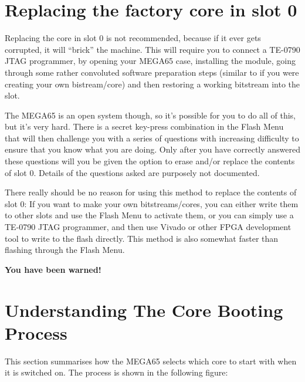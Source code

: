 \section{Replacing the factory core in slot 0}

Replacing the core in slot 0 is not recommended, because if it ever gets corrupted, it will ``brick'' the machine.
This will require you to connect a TE-0790 JTAG programmer, by opening your MEGA65 case, installing
the module, going through some rather convoluted software preparation steps (similar to if you were
creating your own bistream/core) and then restoring a working bitstream into the slot.

The MEGA65 is an open system though, so it's possible for you to do all of this, but it's very hard. There
is a secret key-press combination in the Flash Menu that will then challenge you with a series of questions with
increasing difficulty to ensure that you know what you are doing. Only after you have correctly
answered these questions will you be given the option to erase and/or replace the contents of slot 0.
Details of the questions asked are purposely not documented.

There really should be no reason for using this method to replace the contents of slot 0:
If you want to make your own bitstreams/cores, you can either write them to other slots and use the
Flash Menu to activate them, or you can simply use a TE-0790 JTAG programmer, and then use
Vivado or other FPGA development tool to write to the flash directly. This method is also
somewhat faster than flashing through the Flash Menu.

{\bf You have been warned!}

\section{Understanding The Core Booting Process}

This section summarises how the MEGA65 selects which core to start with when it is switched on.
The process is shown in the following figure:


